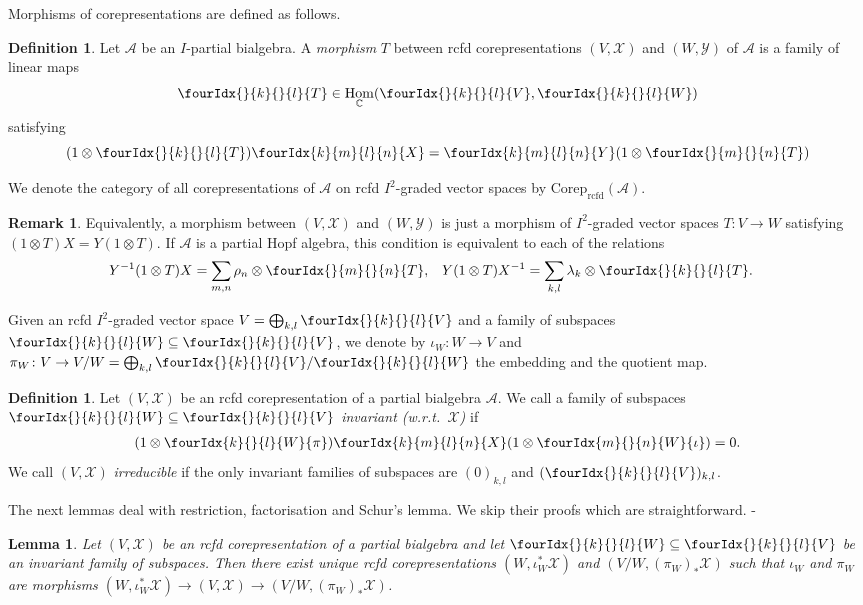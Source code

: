 \documentclass[11pt]{article}
\DeclareMathOperator{\Hom}{Hom}
\DeclareMathOperator{\rcf}{\mathrm{rcfd}}
\newcommand{\Corep}{\mathrm{Corep}}
\newcommand{\C}{\mathbb{C}}
\newcommand{\Gr}[5]{\fourIdx{#2}{#4}{#3}{#5}{#1}}%
\newcommand{\Gru}[3]{\Gr{#1}{}{}{#2}{#3}}
\newtheorem{Lem}[Theorem]{Lemma}
\theoremstyle{definition}
\newtheorem{Def}[Theorem]{Definition}
\newtheorem{Rem}[Theorem]{Remark}
\numberwithin{equation}{section}
\begin{document}
Morphisms of corepresentations are defined as follows.
\begin{Def}
  Let $\mathscr{A}$ be an $I$-partial bialgebra.  A \emph{morphism}
  $T$ between rcfd corepresentations
  $(V,\mathscr{X})$ and $(W,\mathscr{Y})$ of $\mathscr{A}$ is a family
  of linear maps
  \[\Gru{T}{k}{l} \in
  \Hom_\C(\Gru{V}{k}{l},\Gru{W}{k}{l})\] satisfying \[(1 \otimes
  \Gru{T}{k}{l})\Gr{X}{k}{l}{m}{n} = \Gr{Y}{k}{l}{m}{n}(1 \otimes
  \Gru{T}{m}{n})\]
\end{Def}
We denote the category of all corepresentations of $\mathscr{A}$ on rcfd $I^2$-graded vector spaces by
$\Corep_{\rcf}(\mathscr{A})$.
\begin{Rem} \label{remark:rep-total-morphism}
 Equivalently, a morphism between
    $(V,\mathscr{X})$ and $(W,\mathscr{Y})$ is just a morphism of
    $I^{2}$-graded vector spaces $T\colon V\to W$ satisfying
    $(1\otimes T) X= Y(1 \otimes T)$. If $\mathscr{A}$ is  a
    partial Hopf algebra, this condition is equivalent to each of the relations
    \begin{align*}
      Y^{-1}(1 \otimes T)X&=\sum_{m,n} \rho_{n} \otimes \Gru{T}{m}{n},
      &
    Y(1\otimes T)X^{-1} &=\sum_{k,l} \lambda_{k} \otimes \Gru{T}{k}{l}.
    \end{align*}
\end{Rem}


Given an rcfd $I^{2}$-graded vector space $V=\bigoplus_{k,l} \Gru{V}{k}{l}$
and a family of subspaces $\Gru{W}{k}{l} \subseteq \Gru{V}{k}{l}$, we
denote by $\iota_{W}\colon W\to V$ and $\pi_{W} \colon V \to
V/W=\bigoplus_{k,l} \Gru{V}{k}{l}/\Gru{W}{k}{l}$ the embedding and the
quotient map.
\begin{Def} Let $(V,\mathscr{X})$ be an rcfd
  corepresentation of a partial bialgebra $\mathscr{A}$.  We call a
  family of subspaces $\Gru{W}{k}{l} \subseteq \Gru{V}{k}{l}$
  \emph{invariant (w.r.t.\ $\mathscr{X}$)} if
 \begin{align} \label{eq:rep-invariant} (1\otimes
   \Gr{\pi}{k}{l}{}{W})\Gr{X}{k}{l}{m}{n}(1 \otimes
   \Gr{\iota}{m}{n}{}{W}) =0.
  \end{align}
We call $(V,\mathscr{X})$ 
 \emph{irreducible} if the only invariant families of subspaces are
 $(0)_{k,l}$ and $(\Gru{V}{k}{l})_{k,l}$.
\end{Def}

The next lemmas deal with restriction, factorisation and Schur's lemma. We skip their proofs which are straightforward.
-
\begin{Lem}
  Let $(V,\mathscr{X})$ be an rcfd corepresentation
  of a partial bialgebra and let $\Gru{W}{k}{l}
  \subseteq \Gru{V}{k}{l}$ be an invariant family of subspaces. Then
  there exist unique rcfd corepresentations
  $(W,\iota_{W}^{*}\mathscr{X})$ and $(V/W,(\pi_{W})_{*}\mathscr{X})$ 
  such that $\iota_{W}$  and  $\pi_{W}$  are  morphisms  $(W,\iota_{W}^{*}\mathscr{X}) \to (V,\mathscr{X}) \to (V/W,(\pi_{W})_{*}\mathscr{X})$.
\end{Lem}
\end{document}
